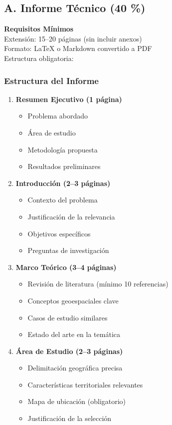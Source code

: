 \documentclass[11pt,a4paper]{article}
\begin{document}
\subsection{A. Informe Técnico (40 \%)}
\textbf{Requisitos Mínimos}\\
Extensión: 15--20 páginas (sin incluir anexos)\\
Formato: LaTeX o Markdown convertido a PDF\\
Estructura obligatoria:

\subsubsection{Estructura del Informe}
\begin{enumerate}[leftmargin=1.2cm]
  \item \textbf{Resumen Ejecutivo (1 página)}
  \begin{itemize}[leftmargin=1.2cm]
    \item Problema abordado
    \item Área de estudio
    \item Metodología propuesta
    \item Resultados preliminares
  \end{itemize}

  \item \textbf{Introducción (2--3 páginas)}
  \begin{itemize}[leftmargin=1.2cm]
    \item Contexto del problema
    \item Justificación de la relevancia
    \item Objetivos específicos
    \item Preguntas de investigación
  \end{itemize}

  \item \textbf{Marco Teórico (3--4 páginas)}
  \begin{itemize}[leftmargin=1.2cm]
    \item Revisión de literatura (mínimo 10 referencias)
    \item Conceptos geoespaciales clave
    \item Casos de estudio similares
    \item Estado del arte en la temática
  \end{itemize}

  \item \textbf{Área de Estudio (2--3 páginas)}
  \begin{itemize}[leftmargin=1.2cm]
    \item Delimitación geográfica precisa
    \item Características territoriales relevantes
    \item Mapa de ubicación (obligatorio)
    \item Justificación de la selección
  \end{itemize}


\end{enumerate}
\end{document}
